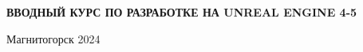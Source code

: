 \begin{titlepage}
    
\begin{center}
    \thispagestyle{empty}
    \vspace*{\fill}
    \textbf{\huge ВВОДНЫЙ КУРС ПО РАЗРАБОТКЕ НА UNREAL ENGINE 4-5}
    \vspace*{\fill}

    Магнитогорск 2024
\end{center}

\end{titlepage}